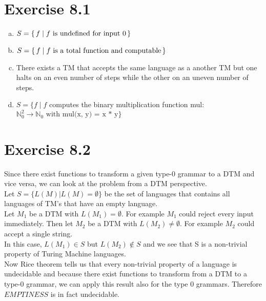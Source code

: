 \documentclass{article} %
\newcommand{\homeworkNumber}{8}
\begin{document}
\section*{Exercise \homeworkNumber.1}

\begin{enumerate}[(a)]
\item $S = \set{f \mid f \text{ is undefined for input } 0}$

\item $S = \set{f \mid f \text{ is a total function and computable}}$

\item There exists a TM that accepts the same language as a another TM but one halts on an even number of steps while the other on an uneven number of steps.

\item $S = \lbrace f \mid f$ computes the binary multiplication function mul: $\mathbb{N}_0^2 \to \mathbb{N}_0 \text{ with mul(x, y) = x * y} \rbrace$
\end{enumerate}

\section*{Exercise \homeworkNumber.2}
Since there exist functions to transform a given type-0 grammar to a DTM and vice versa, we can look at the problem from a DTM perspective.\\
Let $S = \lbrace L(M) \vert L(M) = \emptyset \rbrace$ be the set of languages that contains all languages of TM's that have an empty language.\\

Let $M_1$ be a DTM with $L(M_1) = \emptyset$. For example $M_1$ could reject every input immediately. Then let $M_2$ be a DTM with $L(M_2) \neq \emptyset$. For example $M_2$ could accept a single string.\\

In this case, $L(M_1) \in S$ but $L(M_2) \notin S$ and we see that S is a non-trivial property of Turing Machine languages.\\

Now Rice theorem tells us that every non-trivial property of a language is undecidable and because there exist functions to transform from a DTM to a type-0 grammar, we can apply this result also for the type 0 grammars. Therefore $EMPTINESS$ is in fact undecidable.
\end{document}
